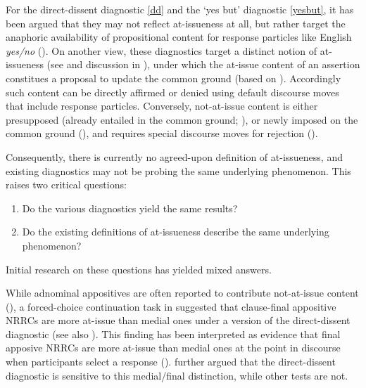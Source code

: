 \documentclass[times,linguex,xcolor]{glossa}
\begin{document}
  For the direct-dissent diagnostic \ref{dd} and the `yes but' diagnostic \ref{yesbut}, it has been argued that they may not reflect at-issueness at all, but rather target the anaphoric availability of propositional content for response particles like English \emph{yes/no} (\citealt{snider_anaphoric_2017,snider_anaphoric_2017,snider_distinguishing_2018}). On another view, these diagnostics target a distinct notion of at-issueness (see \citealt{koev_notions_2018} and discussion in \citealt{faller_discourse_2019,korotkova_evidential_2020}), under which the at-issue content of an assertion constitues a proposal to update the common ground (based on \citealt{farkas_reacting_2010}). Accordingly such content can be directly affirmed or denied using default discourse moves that include response particles. Conversely, not-at-issue content is either presupposed (already entailed in the common ground; \citealt{stalnaker_presuppositions_1973,stalnaker_common_2002}), or newly imposed on the common ground (\citealt{murray_varieties_2014,anderbois_at-issue_2015}), and requires special discourse moves for rejection (\citealt{potts_logic_2005}).

  Consequently, there is currently no agreed-upon definition of at-issueness, and existing diagnostics may not be probing the same underlying phenomenon. This raises two critical questions:

  \begin{enumerate}
    \item Do the various diagnostics yield the same results?
    \item Do the existing definitions of at-issueness describe the same underlying phenomenon?
  \end{enumerate}

  \noindent Initial research on these questions has yielded mixed answers.

  While adnominal appositives are often reported to contribute not-at-issue content (\citealt{potts_logic_2005,amaral_review_2007,tonhauser_diagnosing_2012,destruel_cross-linguistic_2015,tonhauser_how_2018,solstad_cataphoric_2024}), a forced-choice continuation task in \citet{syrett_experimental_2015} suggested that clause-final appositive NRRCs are more at-issue than medial ones under a version of the direct-dissent diagnostic (see also \citealt{anderbois_crossing_2010}). This finding has been interpreted as evidence that final apposive NRRCs are more at-issue than medial ones at the point in discourse when participants select a response (\citealt{syrett_experimental_2015,jasinskaja_not_2016}). \citealt{koev_notions_2018} further argued that the direct-dissent diagnostic is sensitive to this medial/final distinction, while other tests are not.
\end{document}
